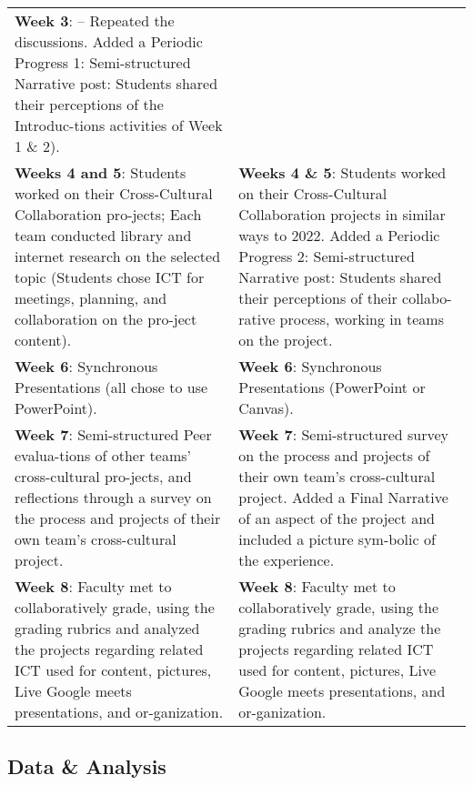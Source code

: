 \begin{table}[htpb]
\begin{threeparttable}
\begin{tabular}{*{2}{p{}}}
\textbf{Week 3}: – Repeated the discussions.
Added a Periodic Progress 1: Semi-structured Narrative post: Students shared their perceptions of the Introduc-tions activities of Week 1 \& 2). \\
										
\textbf{Weeks 4 and 5}: Students worked on their Cross-Cultural Collaboration pro-jects; Each team conducted library and internet research on the selected topic (Students chose ICT for meetings, planning, and collaboration on the pro-ject content). & 
					
\textbf{Weeks 4 \& 5}: Students worked on their Cross-Cultural Collaboration projects in similar ways to 2022.  
Added a Periodic Progress 2: Semi-structured Narrative post: Students shared their perceptions of their collabo-rative process, working in teams on the project. \\
					
\textbf{Week 6}: Synchronous Presentations (all chose to use PowerPoint). &
									
\textbf{Week 6}: Synchronous Presentations (PowerPoint or Canvas). \\
					
\textbf{Week 7}: Semi-structured Peer evalua-tions of other teams' cross-cultural pro-jects, and reflections through a survey on the process and projects of their own team's cross-cultural project. &
					
\textbf{Week 7}: Semi-structured survey on the process and projects of their own team's cross-cultural project.
Added a Final Narrative of an aspect of the project and included a picture sym-bolic of the experience. \\
					
\textbf{Week 8}: Faculty met to collaboratively grade, using the grading rubrics and analyzed the projects regarding related ICT used for content, pictures, Live Google meets presentations, and or-ganization. &
					
\textbf{Week 8}: Faculty met to collaboratively grade, using the grading rubrics and analyze the projects regarding related ICT used for content, pictures, Live Google meets presentations, and or-ganization.\\
\bottomrule
\end{tabular}
\end{threeparttable}
\end{table}

		
\subsection{Data \& Analysis}\label{sub-sec-dataandanalysis}
		

